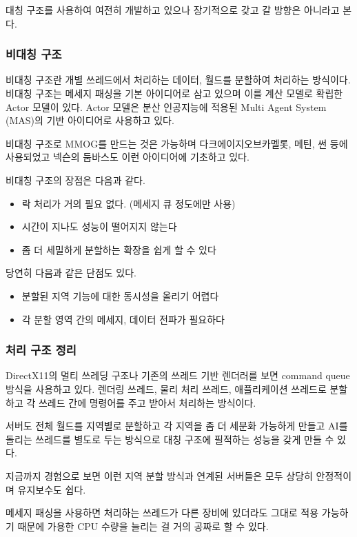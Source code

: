 \documentclass[chapter,kosection, 10.5pt, romanfixed, a4paper]{oblivoir}
\begin{document}
대칭 구조를 사용하여 여전히 개발하고 있으나 장기적으로 갖고 갈 방향은 아니라고 본다. 

\subsubsection{비대칭 구조}

비대칭 구조란 개별 쓰레드에서 처리하는 데이터, 월드를 분할하여 처리하는 
방식이다. 비대칭 구조는 메세지 패싱을 기본 아이디어로 삼고 있으며 이를 
계산 모델로 확립한 Actor 모델이 있다. Actor 모델은 분산 인공지능에 
적용된 Multi Agent System (MAS)의 기반 아이디어로 사용하고 있다. 

비대칭 구조로 MMOG를 만드는 것은 가능하며 다크에이지오브카멜롯, 메틴, 
썬 등에 사용되었고 넥슨의 둠바스도 이런 아이디어에 기초하고 있다. 

비대칭 구조의 장점은 다음과 같다. 
\begin{itemize}
\item 락 처리가 거의 필요 없다. (메세지 큐 정도에만 사용)
\item 시간이 지나도 성능이 떨어지지 않는다
\item 좀 더 세밀하게 분할하는 확장을 쉽게 할 수 있다
\end{itemize}

당연히 다음과 같은 단점도 있다. 
\begin{itemize}
\item 분할된 지역 기능에 대한 동시성을 올리기 어렵다
\item 각 분할 영역 간의 메세지, 데이터 전파가 필요하다
\end{itemize}

\subsubsection{처리 구조 정리}

DirectX11의 멀티 쓰레딩 구조나 기존의 쓰레드 기반 렌더러를 보면 command queue 방식을 
사용하고 있다. 렌더링 쓰레드, 물리 처리 쓰레드, 애플리케이션 쓰레드로 분할 하고 
각 쓰레드 간에 명령어를 주고 받아서 처리하는 방식이다. 

서버도 전체 월드를 지역별로 분할하고 각 지역을 좀 더 세분화 가능하게 만들고 
AI를 돌리는 쓰레드를 별도로 두는 방식으로 대칭 구조에 필적하는 성능을 
갖게 만들 수 있다. 

지금까지 경험으로 보면 이런 지역 분할 방식과 연계된 서버들은 모두 상당히 
안정적이며 유지보수도 쉽다. 

메세지 패싱을 사용하면 처리하는 쓰레드가 다른 장비에 있더라도 그대로 
적용 가능하기 때문에 가용한 CPU 수량을 늘리는 걸 거의 공짜로 할 수 있다. 
\end{document}
